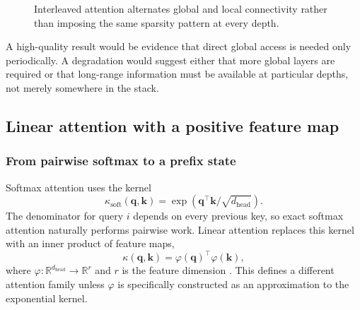 \documentclass[11pt,a4paper]{article}
\theoremstyle{definition}
\theoremstyle{plain}
\newcommand{\vq}{\bm{q}}
\newcommand{\vk}{\bm{k}}
\newcommand{\reals}{\mathbb{R}}
\newcommand{\dhead}{d_{\mathrm{head}}}
\begin{document}
\begin{figure}[H]
\centering
{}
\caption{Interleaved attention alternates global and local connectivity rather than imposing the same sparsity pattern at every depth.}
\label{fig:interleaved-attn}
\end{figure}

A high-quality result would be evidence that direct global access is needed only periodically. A degradation would suggest either that more global layers are required or that long-range information must be available at particular depths, not merely somewhere in the stack.

\subsection{Linear attention with a positive feature map}
\label{sec:linear-attention}

\subsubsection{From pairwise softmax to a prefix state}

Softmax attention uses the kernel
\begin{equation}
    \kappa_{\mathrm{soft}}(\vq,\vk)
    =\exp(\vq^\top\vk/\sqrt{\dhead}).
\end{equation}
The denominator for query $i$ depends on every previous key, so exact softmax attention naturally performs pairwise work. Linear attention replaces this kernel with an inner product of feature maps,
\begin{equation}
    \kappa(\vq,\vk)=\varphi(\vq)^\top\varphi(\vk),
\end{equation}
where $\varphi:\reals^{\dhead}\to\reals^r$ and $r$ is the feature dimension \cite{katharopoulos2020linear}. This defines a different attention family unless $\varphi$ is specifically constructed as an approximation to the exponential kernel.
\end{document}
